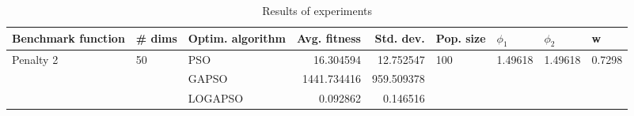 \begin{table}
\centering
\caption{Results of experiments}
\begin{tabular}{lllrrllll}
\toprule
        Benchmark function &             \# dims & Optim. algorithm &  Avg. fitness &  Std. dev. &            Pop. size &               $\phi_{1}$ &               $\phi_{2}$ &                       w \\
\midrule
\multirow{3}{*}{Penalty 2} & \multirow{3}{*}{50} &              PSO &     16.304594 &  12.752547 & \multirow{3}{*}{100} & \multirow{3}{*}{1.49618} & \multirow{3}{*}{1.49618} & \multirow{3}{*}{0.7298} \\
                           &                     &            GAPSO &   1441.734416 & 959.509378 &                      &                          &                          &                         \\
                           &                     &          LOGAPSO &      0.092862 &   0.146516 &                      &                          &                          &                         \\
\bottomrule
\end{tabular}
\end{table}
